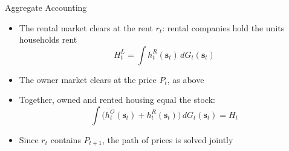 \documentclass[11pt,aspectratio=169]{beamer}
\begin{document}
\begin{frame}{Aggregate Accounting}
\footnotesize
\setlength{\abovedisplayskip}{3pt}\setlength{\belowdisplayskip}{3pt}
\begin{itemize}\setlength\itemsep{6pt}
  \item The rental market clears at the rent $r_t$: rental companies hold the units households rent
  \[
  H^L_t=\int h^R_t(\mathbf s_t)\,dG_t(\mathbf s_t)
  \]
  \item The owner market clears at the price $P_t$, as above
  \item Together, owned and rented housing equal the stock:
  \[
  \int\bigl(h^O_t(\mathbf s_t)+h^R_t(\mathbf s_t)\bigr)\,dG_t(\mathbf s_t)=H_t
  \]
  \item Since $r_t$ contains $P_{t+1}$, the path of prices is solved jointly
\end{itemize}
\end{frame}
\end{document}
